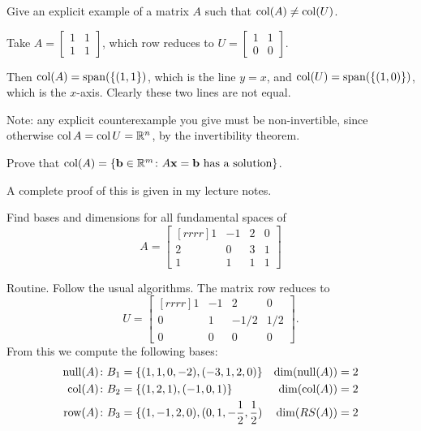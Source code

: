 \ii Give an explicit example of a matrix $A$ such that $\operatorname{col}(A)\ne \operatorname{col}(U)$. 
\\
\begin{solution}
Take $A=\begin{bmatrix}1&1\\1&1 \end{bmatrix}$, which row reduces to $U=\begin{bmatrix} 1&1\\0&0 \end{bmatrix}$. 

Then $\operatorname{col}(A)=\operatorname{span}(\{(1,1\})$, which is the line $y=x$, and $\operatorname{col}(U)=\operatorname{span}(\{(1,0)\})$, which is the $x$-axis. Clearly these two lines are not equal. 

Note: any explicit counterexample you give must be non-invertible, since otherwise $\operatorname{col} A=\operatorname{col} U={\mathbb R}^n$, by the invertibility theorem. 
\end{solution}
\ii Prove that $\operatorname{col}(A)=\{{\mathbf b}\in{\mathbb R}^m\colon A{\mathbf x}={\mathbf b} \text{ has a solution}\}$.
%
\\
\begin{solution}
A complete proof of this is given in my lecture notes.
\end{solution}
\ii Find bases and dimensions for all fundamental spaces of 
\[
A=\begin{bmatrix}[rrrr] 
1&-1&2&0\\
2&0&3&1\\
1&1&1&1
\end{bmatrix}
\]
\begin{solution}
Routine. Follow the usual algorithms. The matrix row reduces to 
\[
U=\begin{bmatrix}[rrrr]
1&-1&2&0\\ 0&1&-1/2&1/2\\ 0&0&0&0
\end{bmatrix}.
\]
From this we compute the following bases:
\begin{align*}
\operatorname{null}(A)\colon B_1&=\{(1,1,0,-2), (-3,1,2,0) \} & \dim(\operatorname{null}(A))&=2\\
\operatorname{col}(A)\colon B_2&=\{ (1,2,1), (-1,0,1) \} & \dim(\operatorname{col}(A))&=2\\
\operatorname{row}(A)\colon B_3&=\{ (1,-1,2,0), (0,1,-\frac{1}{2},\frac{1}{2}) & \dim(RS(A))&=2 
\end{align*}
\end{solution}

